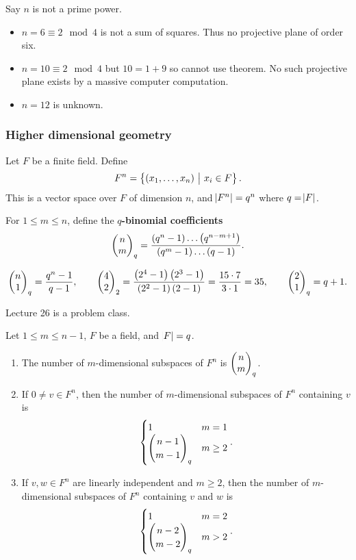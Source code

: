 \begin{example*}
Say $ n $ is not a prime power.
\begin{itemize}
\item $ n = 6 \equiv 2 \mod 4 $ is not a sum of squares. Thus no projective plane of order six.
\item $ n = 10 \equiv 2 \mod 4 $ but $ 10 = 1 + 9 $ so cannot use theorem. No such projective plane exists by a massive computer computation.
\item $ n = 12 $ is unknown.
\end{itemize}
\end{example*}

\pagebreak

\subsubsection{Higher dimensional geometry}

Let $ F $ be a finite field. Define
$$ F^n = \cbr{\br{x_1, \dots, x_n} \st x_i \in F}. $$
This is a vector space over $ F $ of dimension $ n $, and $ \abs{F^n} = q^n $ where $ q = \abs{F} $.

\begin{definition*}
For $ 1 \le m \le n $, define the \textbf{$ q $-binomial coefficients}
$$ \twobyone{n}{m}_q = \dfrac{\br{q^n - 1} \dots \br{q^{n - m + 1}}}{\br{q^m - 1} \dots \br{q - 1}}. $$
\end{definition*}

\begin{example*}
$$ \twobyone{n}{1}_q = \dfrac{q^n - 1}{q - 1}, \qquad \twobyone{4}{2}_2 = \dfrac{\br{2^4 - 1}\br{2^3 - 1}}{\br{2^2 - 1}\br{2 - 1}} = \dfrac{15 \cdot 7}{3 \cdot 1} = 35, \qquad \twobyone{2}{1}_q = q + 1. $$
\end{example*}


Lecture 26 is a problem class.


\begin{proposition}
\label{prop:3.16}
Let $ 1 \le m \le n - 1 $, $ F $ be a field, and $ \abs{F} = q $.
\begin{enumerate}
\item The number of $ m $-dimensional subspaces of $ F^n $ is $ \begin{pmatrix} n \\ m \end{pmatrix}_q $.
\item If $ 0 \ne v \in F^n $, then the number of $ m $-dimensional subspaces of $ F^n $ containing $ v $ is
$$
\begin{cases}
1 & m = 1 \\
\begin{pmatrix} n - 1 \\ m - 1 \end{pmatrix}_q & m \ge 2
\end{cases}.
$$
\item If $ v, w \in F^n $ are linearly independent and $ m \ge 2 $, then the number of $ m $-dimensional subspaces of $ F^n $ containing $ v $ and $ w $ is
$$
\begin{cases}
1 & m = 2 \\
\begin{pmatrix} n - 2 \\ m - 2 \end{pmatrix}_q & m > 2
\end{cases}.
$$
\end{enumerate}
\end{proposition}

